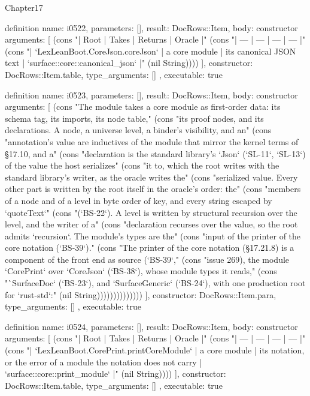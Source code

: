 \begin{lexlean}{Chapter17}
\begin{semanticmodule}
definition{
  name: i0522,
  parameters: [],
  result: DocRows::Item,
  body: constructor{
    arguments: [
      (cons "| Root | Takes | Returns | Oracle |" (cons "| --- | --- | --- | --- |" (cons "| `LexLeanBoot.CoreJson.coreJson` | a core module | its canonical JSON text | `surface::core::canonical_json` |" (nil String))))
    ],
    constructor: DocRows::Item.table,
    type_arguments: []
  },
  executable: true
}

definition{
  name: i0523,
  parameters: [],
  result: DocRows::Item,
  body: constructor{
    arguments: [
      (cons "The module takes a core module as first-order data: its schema tag, its imports, its node table," (cons "its proof nodes, and its declarations. A node, a universe level, a binder's visibility, and an" (cons "annotation's value are inductives of the module that mirror the kernel terms of §17.10, and a" (cons "declaration is the standard library's `Json` (`SL-11`, `SL-13`) of the value the host serializes" (cons "it to, which the root writes with the standard library's writer, as the oracle writes the" (cons "serialized value. Every other part is written by the root itself in the oracle's order: the" (cons "members of a node and of a level in byte order of key, and every string escaped by `quoteText`" (cons "(`BS-22`). A level is written by structural recursion over the level, and the writer of a" (cons "declaration recurses over the value, so the root admits `recursion`. The module's types are the" (cons "input of the printer of the core notation (`BS-39`)." (cons "The printer of the core notation (§17.21.8) is a component of the front end as source (`BS-39`," (cons "issue 269), the module `CorePrint` over `CoreJson` (`BS-38`), whose module types it reads," (cons "`SurfaceDoc` (`BS-23`), and `SurfaceGeneric` (`BS-24`), with one production root for `rust-std`:" (nil String))))))))))))))
    ],
    constructor: DocRows::Item.para,
    type_arguments: []
  },
  executable: true
}

definition{
  name: i0524,
  parameters: [],
  result: DocRows::Item,
  body: constructor{
    arguments: [
      (cons "| Root | Takes | Returns | Oracle |" (cons "| --- | --- | --- | --- |" (cons "| `LexLeanBoot.CorePrint.printCoreModule` | a core module | its notation, or the error of a module the notation does not carry | `surface::core::print_module` |" (nil String))))
    ],
    constructor: DocRows::Item.table,
    type_arguments: []
  },
  executable: true
}


\end{semanticmodule}
\end{lexlean}
